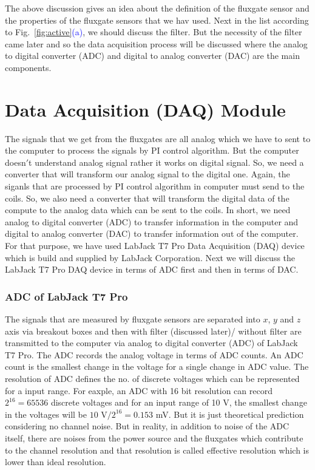 

The above discussion gives an idea about the definition of the fluxgate sensor and the properties of the fluxgate sensors that we hav used. Next in the list according to Fig.~\ref{fig:active}\textcolor{blue}{(a)}, we should discuss the filter. But the necessity of the filter came later and so the data acquisition process will be discussed  where the analog to digital converter (ADC) and digital to analog converter (DAC) are the main components.


\section{Data Acquisition (DAQ) Module}\label{sec:DAQ}

The signals that we get from the fluxgates are all analog which we have to sent to the computer to process the signals by PI control algorithm. But the computer doesn$'$t understand analog signal rather it works on digital signal. So, we need a converter that will transform our analog signal to the digital one. Again, the siganls that are processed by PI control algorithm in computer must send to the coils. So, we also need a converter that will transform the digital data of the compute to the analog data which can be sent to the coils. In short, we need analog to digital converter (ADC) to transfer information in the computer and digital to analog converter (DAC) to transfer information out of the computer. For that purpose, we have used LabJack T7 Pro Data Acquisition (DAQ) device which is build and supplied by LabJack Corporation. Next we will discuss the LabJack T7 Pro DAQ device in terms of ADC first and then in terms of DAC.

\subsubsection{ADC of LabJack T7 Pro}

The signals that are measured by fluxgate sensors are separated into $x$, $y$ and $z$ axis via breakout boxes and then with filter (discussed later)/ without filter are transmitted to the computer via analog to digital converter (ADC) of LabJack T7 Pro. The ADC records the analog voltage in terms of ADC counts. An ADC count is the smallest change in the voltage for a single change in ADC value. The resolution of ADC defines the no. of discrete voltages which can be represented for a input range. For eaxple, an ADC with 16 bit resolution can record $\mathrm{2^16=65536}$ discrete voltages and for an input range of 10 V, the smallest change in the voltages will be $\mathrm{10}$ V$\mathrm{/2^16=0.153}$ mV. But it is just theoretical prediction considering no channel noise. But in reality, in addition to noise of the ADC itself, there are noises from the power source and the fluxgates which contribute to the channel resolution and that resolution is called effective resolution which is lower than ideal resolution.

